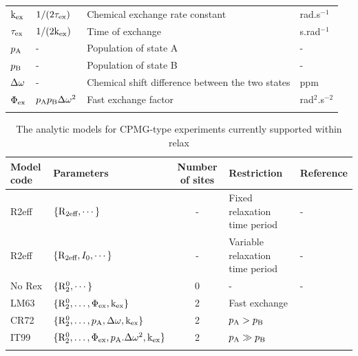 \begin{table}
\begin{center}
\begin{tabular}{llll}
$\textrm{k}_\textrm{ex}$                  & $1 / (2 \tau_\textrm{ex})$        & Chemical exchange rate constant                                               & rad.s$^{-1}$ \\
$\tau_\textrm{ex}$                  & $1 / (2 \textrm{k}_\textrm{ex})$        & Time of exchange                                                              & s.rad$^{-1}$ \\
$p_\textrm{A}$                   & -                     & Population of state A                                                         & - \\
$p_\textrm{B}$                   & -                     & Population of state B                                                         & - \\
$\Delta\omega$                   & -                     & Chemical shift difference between the two states                              & ppm \\
$\Phi_\textrm{ex}$                & $p_\textrm{A}p_\textrm{B}\Delta\omega^2$         & Fast exchange factor                                                          & rad$^2$.s$^{-2}$ \\
\bottomrule
\label{table: dispersion parameters}
\end{tabular}
\end{center}
\end{table}


\begin{table}
\begin{center}
\caption{The analytic models for CPMG-type experiments currently supported within relax}
\begin{tabular}{llcll}
\toprule
Model code              & Parameters                                        & Number of sites   & Restriction                       & Reference \\
\midrule
R2eff                   & $\{\mathrm{R}_{2\textrm{eff}}, \cdots\}$                            & -                 & Fixed relaxation time period      & - \\
R2eff                   & $\{\mathrm{R}_{2\textrm{eff}}, I_0, \cdots\}$                       & -                 & Variable relaxation time period   & - \\
No Rex                  & $\{\mathrm{R}_2^0, \cdots\}$                           & 0                 & -                                 & - \\
LM63                    & $\{\mathrm{R}_2^0, \dots, \Phi_\textrm{ex}, \textrm{k}_\textrm{ex}\}$              & 2                 & Fast exchange                     & \citet{LuzMeiboom63} \\
CR72                    & $\{\mathrm{R}_2^0, \dots, p_\textrm{A}, \Delta\omega, \textrm{k}_\textrm{ex}\}$            & 2                 & $p_\textrm{A} > p_\textrm{B}$                       & \citet{CarverRichards72} \\
IT99                    & $\{\mathrm{R}_2^0, \dots, \Phi_\textrm{ex}, p_\textrm{A}.\Delta\omega^2, \textrm{k}_\textrm{ex}\}$   & 2                 & $p_\textrm{A} \gg p_\textrm{B}$                     & \citet{IshimaTorchia99} \\
\bottomrule
\label{table: CPMG dispersion models}
\end{tabular}
\end{center}
\end{table}


